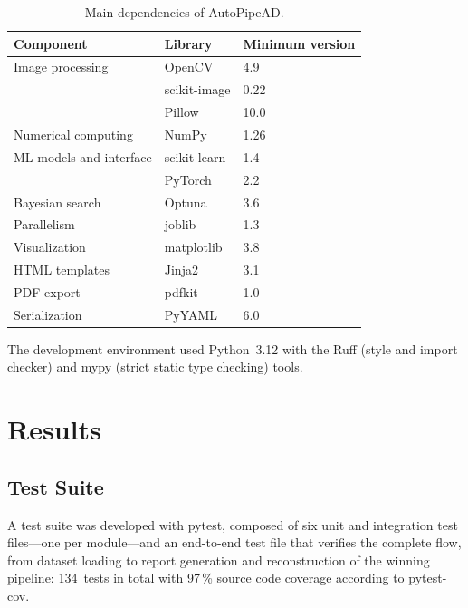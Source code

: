 \documentclass[conference]{IEEEtran}
\begin{document}
\begin{table}[t]
\centering
\renewcommand{\arraystretch}{1.2}
\caption{Main dependencies of AutoPipeAD.}
\label{tab:tecnologias}
\begin{tabular}{@{}lll@{}}
\toprule
\textbf{Component} & \textbf{Library} & \textbf{Minimum version} \\
\midrule
Image processing          & OpenCV        & 4.9  \\
                          & scikit-image  & 0.22 \\
                          & Pillow        & 10.0 \\
Numerical computing       & NumPy         & 1.26 \\
ML models and interface   & scikit-learn  & 1.4  \\
                          & PyTorch       & 2.2  \\
Bayesian search           & Optuna        & 3.6  \\
Parallelism               & joblib        & 1.3  \\
Visualization             & matplotlib    & 3.8  \\
HTML templates            & Jinja2        & 3.1  \\
PDF export                & pdfkit        & 1.0  \\
Serialization             & PyYAML        & 6.0  \\
\bottomrule
\end{tabular}
\end{table}

The development environment used Python~3.12 with the Ruff (style and import
checker) and mypy (strict static type checking) tools.

\section{Results}

\subsection{Test Suite}

A test suite was developed with pytest, composed of six unit and integration
test files—one per module—and an end-to-end test file that verifies the
complete flow, from dataset loading to report generation and reconstruction of
the winning pipeline: 134~tests in total with 97\,\% source code coverage
according to pytest-cov.
\end{document}
